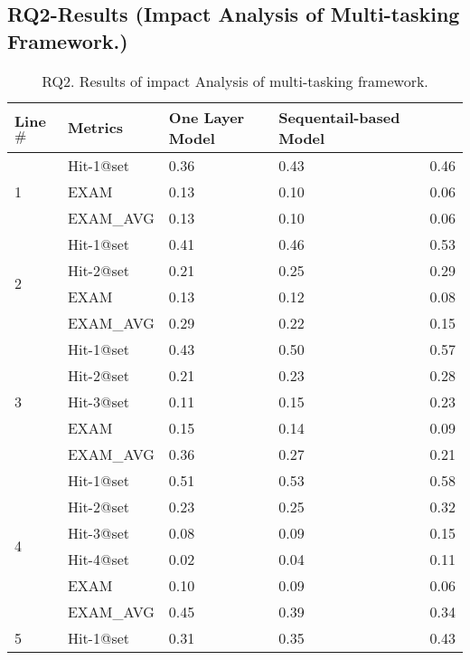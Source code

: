 \subsection{RQ2-Results ({\bf Impact Analysis of Multi-tasking Framework.})}

\iffalse

\begin{table}[b]
	\caption{RQ2. Results of impact Analysis of multi-tasking framework.}
	{\small
		\begin{center}
			\renewcommand{\arraystretch}{1}
			\begin{tabular}{p{0.5cm}<{\centering}|p{1.5cm}<{\centering}|p{1.5cm}<{\centering}|p{1.5cm}<{\centering}|p{1.2cm}<{\centering}}
				\hline
				Line$\#$ & Metrics & One Layer Model & Sequentail-based Model & \tool \\
				\hline
				\multirow{3}{*}{1}  & Hit-1@set     & 0.36 & 0.43 & 0.46  \\
									& EXAM          & 0.13 & 0.10 & 0.06  \\
									& EXAM\_AVG     & 0.13 & 0.10 & 0.06  \\
				\hline
				\multirow{4}{*}{2}  & Hit-1@set     & 0.41 & 0.46 & 0.53  \\
									& Hit-2@set     & 0.21 & 0.25 & 0.29  \\
									& EXAM          & 0.13 & 0.12 & 0.08  \\
									& EXAM\_AVG     & 0.29 & 0.22 & 0.15 \\
				\hline
				\multirow{5}{*}{3}  & Hit-1@set     & 0.43 & 0.50 & 0.57 \\
									& Hit-2@set     & 0.21 & 0.23 & 0.28 \\
									& Hit-3@set     & 0.11 & 0.15 & 0.23 \\
									& EXAM          & 0.15 & 0.14 & 0.09 \\
									& EXAM\_AVG     & 0.36 & 0.27 & 0.21 \\
				\hline
				\multirow{6}{*}{4}  & Hit-1@set     & 0.51 & 0.53 & 0.58 \\
									& Hit-2@set     & 0.23 & 0.25 & 0.32 \\
									& Hit-3@set     & 0.08 & 0.09 & 0.15 \\
									& Hit-4@set     & 0.02 & 0.04 & 0.11 \\
									& EXAM          & 0.10 & 0.09 & 0.06 \\
									& EXAM\_AVG     & 0.45 & 0.39 & 0.34 \\
				\hline
				\multirow{7}{*}{5}  & Hit-1@set     & 0.31 & 0.35 & 0.43 \\

\end{tabular}
\end{center}}
\end{table}
